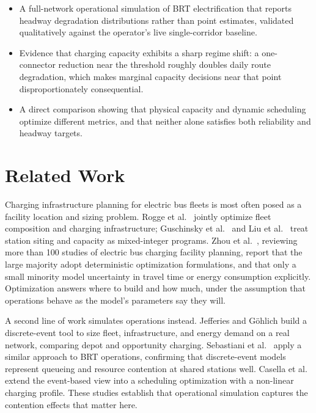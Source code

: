 \documentclass[conference]{IEEEtran}
\begin{document}
\begin{itemize}
\item A full-network operational simulation of BRT electrification that
reports headway degradation distributions rather than point estimates,
validated qualitatively against the operator's live single-corridor
baseline.
\item Evidence that charging capacity exhibits a sharp regime shift: a
one-connector reduction near the threshold roughly doubles daily route
degradation, which makes marginal capacity decisions near that point
disproportionately consequential.
\item A direct comparison showing that physical capacity and dynamic
scheduling optimize different metrics, and that neither alone satisfies
both reliability and headway targets.
\end{itemize}

\section{Related Work}

Charging infrastructure planning for electric bus fleets is most often
posed as a facility location and sizing problem. Rogge et al.\
\cite{rogge2018} jointly optimize fleet composition and charging
infrastructure; Guschinsky et al.\ \cite{guschinsky2021} and Liu et al.\
\cite{liu2021} treat station siting and capacity as mixed-integer
programs. Zhou et al.\ \cite{zhou2024}, reviewing more than 100 studies
of electric bus charging facility planning, report that the large
majority adopt deterministic optimization formulations, and that only a
small minority model uncertainty in travel time or energy consumption
explicitly. Optimization answers where to build and how much, under the
assumption that operations behave as the model's parameters say they
will.

A second line of work simulates operations instead. Jefferies and
Göhlich \cite{jefferiesgohlich2020} build a discrete-event tool to size
fleet, infrastructure, and energy demand on a real network, comparing
depot and opportunity charging. Sebastiani et al.\ \cite{sebastiani2016}
apply a similar approach to BRT operations, confirming that discrete-event
models represent queueing and resource contention at shared stations
well. Casella et al.\ \cite{casella2024} extend the event-based view into
a scheduling optimization with a non-linear charging profile. These
studies establish that operational simulation captures the contention
effects that matter here.
\end{document}
